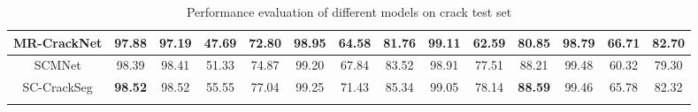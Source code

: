 \documentclass[a4paper,12pt]{report}
\begin{document}
\begin{table}[ht]
\begin{adjustbox}{width=\columnwidth,center}
\begin{tabular}{|c|c|c|c|c|c|c|c|c|c|c|c|c|c|}
            \hline
            {MR-CrackNet\cite{nayyeri_multi-resolution_2021}} & {97.88}        & {97.19}                            & {47.69}                                 & {72.80}                                  & {98.95}                               & {64.58} & {81.76}        & {99.11} & {62.59} & {80.85}        & {98.79} & {66.71} & {82.70}        \\
            \hline
            {SCMNet\cite{singha_scmnet_2021}}                 & {98.39}        & {98.41}                            & {51.33}                                 & {74.87}                                  & {99.20}                               & {67.84} & {83.52}        & {98.91} & {77.51} & {88.21}        & {99.48} & {60.32} & {79.30}        \\
            \hline
            {SC-CrackSeg}                                     & \textbf{98.52} & {98.52}                            & {55.55}                                 & {77.04}                                  & {99.25}                               & {71.43} & {85.34}        & {99.05} & {78.14} & \textbf{88.59} & {99.46} & {65.78} & {82.32}        \\
            \hline
            \multicolumn{11}{l}{}
        \end{tabular}
    \end{adjustbox}
    \caption{Performance evaluation of different models on crack test set}%
    \label{tab:sc-crackseg-initial-performance-comparison}
\end{table}
\end{document}
